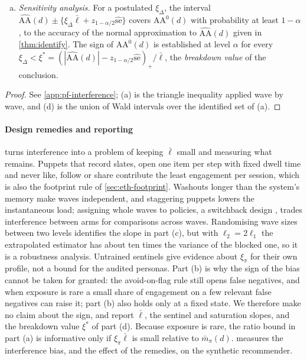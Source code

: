 \begin{proposition}
\begin{enumerate}[(a)]
  \item \emph{Sensitivity analysis.} For a postulated $\xi_\Delta$, the interval $\widehat{\mathrm{AA}}(d)\pm\{\xi_\Delta\bar\ell+z_{1-\alpha/2}\widehat{\mathrm{se}}\}$ covers $\mathrm{AA}^0(d)$ with probability at least $1-\alpha$, to the accuracy of the normal approximation to $\widehat{\mathrm{AA}}(d)$ given in \cref{thm:identify}. The sign of $\mathrm{AA}^0(d)$ is established at level $\alpha$ for every $\xi_\Delta<\xi^\ast=(|\widehat{\mathrm{AA}}(d)|-z_{1-\alpha/2}\widehat{\mathrm{se}})_+/\bar\ell$, the \emph{breakdown value} of the conclusion.
\end{enumerate}
\end{proposition}

\begin{proof}See \cref{app:pf-interference}; (a) is the triangle inequality applied wave by wave, and (d) is the union of Wald intervals over the identified set of (a).\end{proof}

\paragraph{Design remedies and reporting}
 turns interference into a problem of keeping $\bar\ell$ small and measuring what remains. Puppets that record slates, open one item per step with fixed dwell time and never like, follow or share contribute the least engagement per session, which is also the footprint rule of \cref{sec:eth-footprint}. Washouts longer than the system's memory make waves independent, and staggering puppets lowers the instantaneous load; assigning whole waves to policies, a switchback design \citep{bojinov2023}, trades interference between arms for comparisons across waves. Randomising wave sizes between two levels \citep{baird2018} identifies the slope in part (c), but with $\ell_2=2\ell_1$ the extrapolated estimator has about ten times the variance of the blocked one, so it is a robustness analysis. Untrained sentinels give evidence about $\xi_\pi$ for their own profile, not a bound for the audited personas. Part (b) is why the sign of the bias cannot be taken for granted: the avoid-on-flag rule still opens false negatives, and when exposure is rare a small share of engagement on a few relevant false negatives can raise it; part (b) also holds only at a fixed state. We therefore make no claim about the sign, and report $\bar\ell$, the sentinel and saturation slopes, and the breakdown value $\xi^\ast$ of part (d). Because exposure is rare, the ratio bound in part (a) is informative only if $\xi_\pi\bar\ell$ is small relative to $\bar m_\pi(d)$.  measures the interference bias, and the effect of the remedies, on the synthetic recommender.

